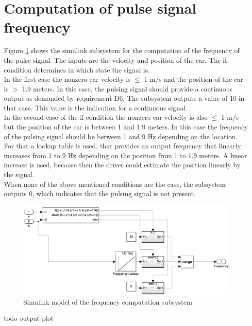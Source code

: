 \section{Computation of pulse signal frequency}\label{sec:D6Frequency}
Figure \ref{fig:D6_Frequency_Computation} shows the simulink subsystem for the computation of the frequency of the pulse signal.
The inputs are the velocity and position of the car.
The if-condition determines in which state the signal is.\\
In the first case the nonzero car velocity is $\leq$ 1 m/s and the position of the car is $>$ 1.9 meters.
In this case, the pulsing signal should provide a continuous output as demanded by requirement D6.
The subsystem outputs a value of 10 in that case.
This value is the indication for a continuous signal.\\
In the second case of the if condition the nonzero car velocity is also $\leq$ 1 m/s but the position of the car is between 1 and 1.9 meters.
In this case the frequency of the pulsing signal should be between 1 and 9 Hz depending on the location.
For that a lookup table is used, that provides an output frequency that linearly increases from 1 to 9 Hz depending on the position from 1 to 1.9 meters. A linear increase is used, because then the driver could estimate the position linearly by the signal.\\
When none of the above mentioned conditions are the case, the subsystem outputs 0, which indicates that the pulsing signal is not present.

\begin{figure}[H]
\centering
\includegraphics[width=1\textwidth]{images/D6_Frequency_Computation.png}
\caption{Simulink model of the frequency computation subsystem}
\label{fig:D6_Frequency_Computation}
\end{figure}

todo output plot
